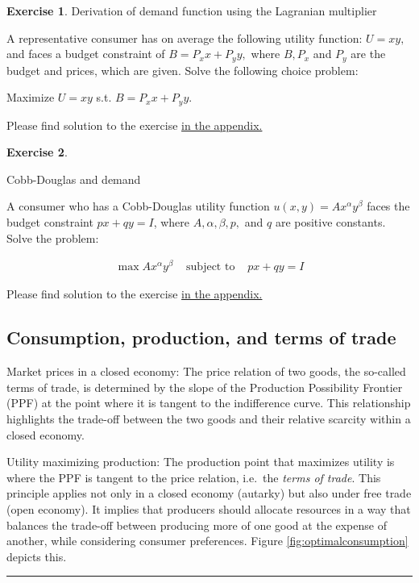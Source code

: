\documentclass[
  12pt,
  oneside]{book}
\theoremstyle{definition}
\theoremstyle{definition}
\theoremstyle{definition}
\newtheorem{exercise}{Exercise}[chapter]
\theoremstyle{definition}
\theoremstyle{remark}
\begin{document}
\begin{exercise}
\protect\hypertarget{exr:derofdemand}{}\label{exr:derofdemand}Derivation of demand function using the Lagranian multiplier

A representative consumer has on average the following utility function:
\(U=x y,\) and faces a budget constraint of \(B=P_{x} x+P_{y} y,\) where \(B, P_{x}\)
and \(P_{y}\) are the budget and prices, which are given. Solve the following choice problem:

Maximize \(U=x y\) s.t. \(B=P_{x} x+P_{y} y\).

Please find solution to the exercise \protect\hyperlink{sol:derofdemand}{in the appendix.}
\end{exercise}

\begin{exercise}
\protect\hypertarget{exr:cdanddemand}{}\label{exr:cdanddemand}

Cobb-Douglas and demand

A consumer who has a Cobb-Douglas utility function \(u(x, y)=A x^{\alpha} y^{\beta}\)
faces the budget constraint \(p x+q y=I\), where \(A, \alpha, \beta, p,\) and \(q\) are
positive constants.
Solve the problem:

\[
\begin{array}{lll}
\max A x^{\alpha} y^{\beta} & \text { subject to } & p x+q y=I
\end{array}
\]

Please find solution to the exercise \protect\hyperlink{sol:cdanddemand}{in the appendix.}

\hypertarget{consumption-production-and-terms-of-trade}{%
\subsection{Consumption, production, and terms of trade}\label{consumption-production-and-terms-of-trade}}

Market prices in a closed economy:
The price relation of two goods, the so-called terms of trade, is determined by the slope of the Production Possibility Frontier (PPF) at the point where it is tangent to the indifference curve. This relationship highlights the trade-off between the two goods and their relative scarcity within a closed economy.

Utility maximizing production:
The production point that maximizes utility is where the PPF is tangent to the price relation, i.e.~the \emph{terms of trade}. This principle applies not only in a closed economy (autarky) but also under free trade (open economy). It implies that producers should allocate resources in a way that balances the trade-off between producing more of one good at the expense of another, while considering consumer preferences. Figure \ref{fig:optimalconsumption} depicts this.

\begin{center}\rule{0.5\linewidth}{0.5pt}\end{center}

\end{exercise}
\end{document}
